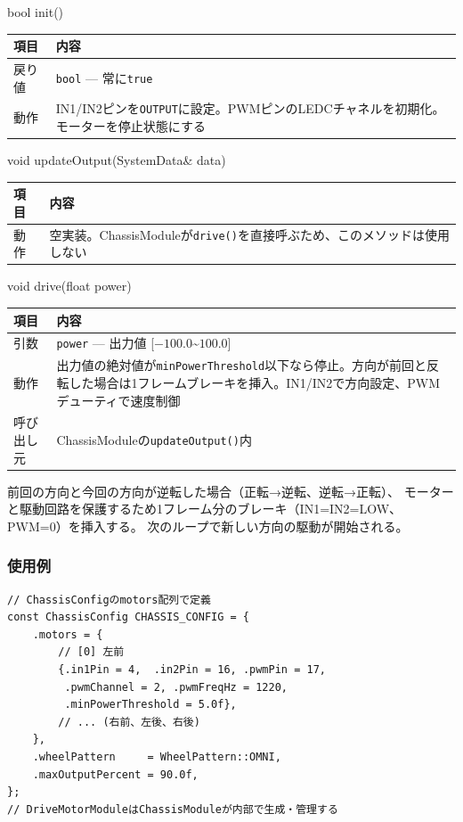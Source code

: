 \begin{funcblock}{bool init()}
\begin{tabularx}{\textwidth}{l X}
\toprule
\textbf{項目} & \textbf{内容} \\
\midrule
戻り値   & \texttt{bool} --- 常に\texttt{true} \\
動作     & IN1/IN2ピンを\texttt{OUTPUT}に設定。PWMピンのLEDCチャネルを初期化。モーターを停止状態にする \\
\bottomrule
\end{tabularx}
\end{funcblock}

\begin{funcblock}{void updateOutput(SystemData\& data)}
\begin{tabularx}{\textwidth}{l X}
\toprule
\textbf{項目} & \textbf{内容} \\
\midrule
動作   & 空実装。ChassisModuleが\texttt{drive()}を直接呼ぶため、このメソッドは使用しない \\
\bottomrule
\end{tabularx}
\end{funcblock}

\begin{funcblock}{void drive(float power)}
\begin{tabularx}{\textwidth}{l X}
\toprule
\textbf{項目} & \textbf{内容} \\
\midrule
引数       & \texttt{power} --- 出力値 [$-100.0$\textasciitilde$100.0$] \\
動作       & 出力値の絶対値が\texttt{minPowerThreshold}以下なら停止。方向が前回と反転した場合は1フレームブレーキを挿入。IN1/IN2で方向設定、PWMデューティで速度制御 \\
呼び出し元 & ChassisModuleの\texttt{updateOutput()}内 \\
\bottomrule
\end{tabularx}
\end{funcblock}

\begin{notebox}[方向反転時のブレーキ]
前回の方向と今回の方向が逆転した場合（正転→逆転、逆転→正転）、
モーターと駆動回路を保護するため1フレーム分のブレーキ（IN1=IN2=LOW、PWM=0）を挿入する。
次のループで新しい方向の駆動が開始される。
\end{notebox}

\subsubsection{使用例}

\begin{lstlisting}[style=cppstyle, caption={DriveMotorModuleの使用例（ChassisModule内部）}]
// ChassisConfigのmotors配列で定義
const ChassisConfig CHASSIS_CONFIG = {
    .motors = {
        // [0] 左前
        {.in1Pin = 4,  .in2Pin = 16, .pwmPin = 17,
         .pwmChannel = 2, .pwmFreqHz = 1220,
         .minPowerThreshold = 5.0f},
        // ... (右前、左後、右後)
    },
    .wheelPattern     = WheelPattern::OMNI,
    .maxOutputPercent = 90.0f,
};
// DriveMotorModuleはChassisModuleが内部で生成・管理する
\end{lstlisting}
